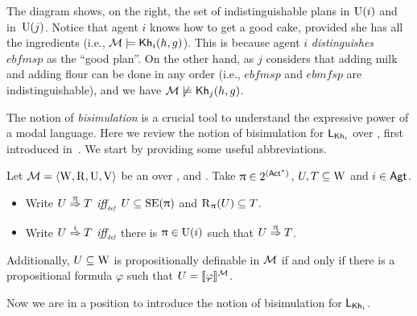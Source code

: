 \begin{example}
\medskip

The diagram shows, on the right, the set of indistinguishable plans in $\operatorname{U}(i)$ and in~$\operatorname{U}(j)$. %
Notice that agent $i$ knows how to get a good cake, provided she has all the ingredients (i.e., $\mathcal{M}\models{\sf Kh}_i(h,g)$). This is because agent $i$ \emph{distinguishes} $\mathit{ebfmsp}$ as the ``good plan''. On the other hand, as $j$ considers that adding milk and adding flour can be done in any order (i.e., $\mathit{ebfmsp}$ and $\mathit{ebmfsp}$ are indistinguishable), and we have $\mathcal{M}\not\models{\sf Kh}_j(h,g)$.
\end{example}

\medskip 

The notion of \emph{bisimulation} is a crucial tool to understand the expressive power of a modal language. Here we review the notion of bisimulation for $\mathsf{L}_{{\sf Kh}_i}$ over \ultss, first introduced in~\cite{AFSVQ23report}. We start by providing some useful abbreviations.

\medskip

\begin{definition}\label{def:notation}
Let $\mathcal{M}=\langle \operatorname{W},\operatorname{R},\operatorname{U},\operatorname{V} \rangle$ be an \ults over \PROP, \ACT and \AGT. Take $\uppi \in 2^{({\rm \sf Act}^*)}$, $U, T \subseteq \operatorname{W}$ and $i \in {\rm \sf Agt}$.
\begin{itemize} \itemsep 0pt
    \item Write $U \stackrel{\uppi}{\Rightarrow} T$ $\mbox{\it iff}_{\mbox{\tiny\it def}}$ $U \subseteq \operatorname{SE}(\uppi)$ and $\operatorname{R}_{\uppi}(U) \subseteq T$.

    \item Write $U \stackrel{i}{\Rightarrow} T$ $\mbox{\it iff}_{\mbox{\tiny\it def}}$ there is $\uppi \in \operatorname{U}(i)$ such that $U \stackrel{\uppi}{\Rightarrow} T$.
\end{itemize}
Additionally, $U \subseteq \operatorname{W}$ is propositionally definable in $\mathcal{M}$ if and only if there is a propositional formula $\varphi$ such that $U = \llbracket \varphi \rrbracket^{\mathcal{M}}$.
\end{definition}

\medskip

Now we are in a position to introduce the notion of bisimulation for $\mathsf{L}_{{\sf Kh}_i}$. 

\medskip 

